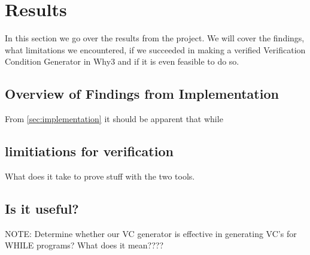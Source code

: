 \section{Results}
In this section we go over the results from the project.
We will cover the findings,
what limitations we encountered,
if we succeeded in making a verified Verification Condition Generator in Why3 and if it is even feasible to do so.

\subsection{Overview of Findings from Implementation}
From \ref{sec:implementation} it should be apparent that while


\subsection{limitiations for verification}
What does it take to prove stuff with the two tools.

\subsection{Is it useful?}
NOTE: Determine whether our VC generator is effective in generating VC's for WHILE programs?
What does it mean????
